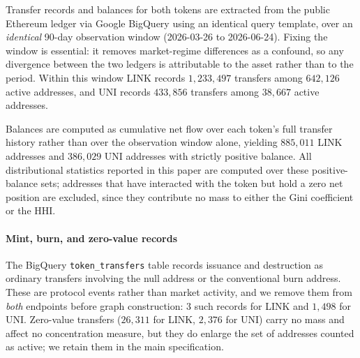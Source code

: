 \documentclass[final,5p,times]{elsarticle}
\begin{document}
Transfer records and balances for both tokens are extracted from the public
Ethereum ledger via Google BigQuery using an identical query template, over
an \emph{identical} 90-day observation window (2026-03-26 to 2026-06-24).
Fixing the window is essential: it removes market-regime differences as a
confound, so any divergence between the two ledgers is attributable to the
asset rather than to the period. Within this window LINK records
$1{,}233{,}497$ transfers among $642{,}126$ active addresses, and UNI
records $433{,}856$ transfers among $38{,}667$ active addresses.

Balances are computed as cumulative net flow over each token's full
transfer history rather than over the observation window alone, yielding
$885{,}011$ LINK addresses and $386{,}029$ UNI addresses with strictly
positive balance. All distributional statistics reported in this paper are
computed over these positive-balance sets; addresses that have interacted
with the token but hold a zero net position are excluded, since they
contribute no mass to either the Gini coefficient or the HHI.

\paragraph{Mint, burn, and zero-value records}
The BigQuery \texttt{token\_transfers} table records issuance and
destruction as ordinary transfers involving the null address or the
conventional burn address. These are protocol events rather than market
activity, and we remove them from \emph{both} endpoints before graph
construction: $3$ such records for LINK and $1{,}498$ for UNI. Zero-value
transfers ($26{,}311$ for LINK, $2{,}376$ for UNI) carry no mass and affect
no concentration measure, but they do enlarge the set of addresses counted
as active; we retain them in the main specification.
\end{document}
